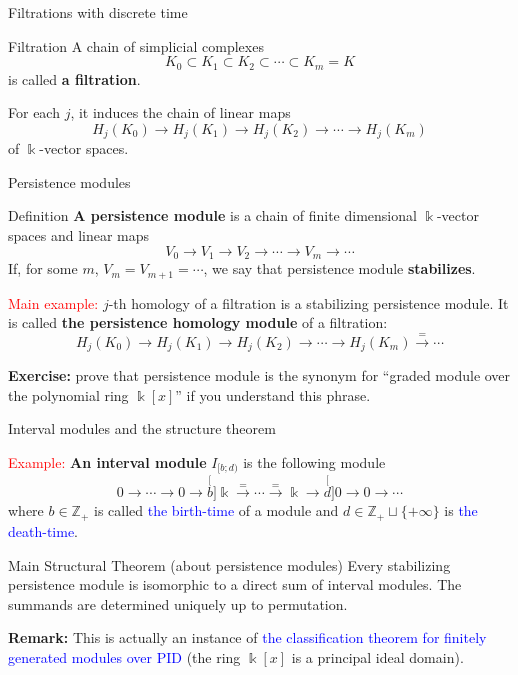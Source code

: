 \documentclass[10pt,xcolor={usenames}]{beamer}
\newcommand{\ko}{\Bbbk}
\newcommand{\Zo}{\mathbb{Z}}
\begin{document}
\begin{frame}{Filtrations with discrete time}

\begin{block}{Filtration}
A chain of simplicial complexes
\[
K_0\subset K_1\subset K_2\subset\cdots\subset K_m=K
\]
is called \textbf{a filtration}.
\end{block}

For each $j$, it induces the chain of linear maps
\[
H_j(K_0)\to H_j(K_1)\to H_j(K_2)\to\cdots\to H_j(K_m)
\]
of $\ko$-vector spaces.
\end{frame}

\begin{frame}{Persistence modules}

\begin{block}{Definition}
\textbf{A persistence module} is a chain of finite dimensional $\ko$-vector spaces and linear maps
\[
V_0\to V_1\to V_2\to\cdots\to V_m\to\cdots
\]
If, for some $m$, $V_m=V_{m+1}=\cdots$, we say that persistence module \textbf{stabilizes}.
\end{block}

\textcolor{red}{Main example:} $j$-th homology of a filtration is a stabilizing persistence module. It is called \textbf{the persistence homology module} of a filtration:
\[
H_j(K_0)\to H_j(K_1)\to H_j(K_2)\to\cdots\to H_j(K_m)\stackrel{=}{\to}\cdots
\]
\pause

\textbf{Exercise:} prove that persistence module is the synonym for ``graded module over the polynomial ring $\ko[x]$'' if you understand this phrase.
\end{frame}

\begin{frame}{Interval modules and the structure theorem}

\textcolor{red}{Example:} \textbf{An interval module} $I_{[b;d)}$ is the following module
\[
0\to \cdots \to 0\to\stackrel[b]{}{\ko}\stackrel{=}{\to}\cdots\stackrel{=}{\to} \ko\to \stackrel[d]{}{0}\to 0\to\cdots
\]
where $b\in \Zo_+$ is called \textcolor{blue}{the birth-time} of a module and $d\in \Zo_+\sqcup\{+\infty\}$ is \textcolor{blue}{the death-time}. \pause

\begin{block}{Main Structural Theorem (about persistence modules)}
Every stabilizing persistence module is isomorphic to a direct sum of interval modules. The summands are determined uniquely up to permutation.
\end{block}

\pause

\textbf{Remark:} This is actually an instance of \textcolor{blue}{the classification theorem for finitely generated modules over PID} (the ring $\ko[x]$ is a principal ideal domain).

\end{frame}
\end{document}
